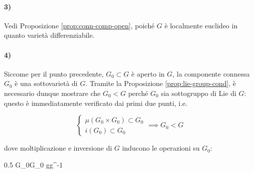 {\paragraph{3)}

Vedi Proposizione \ref{prop:conn-comp-open}, poiché $ G $ è localmente euclideo in quanto varietà differenziabile.

\paragraph{4)}

Siccome per il punto precedente, $ G_{0} \subset G $ è aperto in $ G $, la componente connessa $ G_{0} $ è una sottovarietà di $ G $. Tramite la Proposizione \ref{prop:lie-group-cond}, è necessario dunque mostrare che $ G_{0} < G $ perché $ G_{0} $ sia sottogruppo di Lie di $ G $: questo è immediatamente verificato dai primi due punti, i.e.

\begin{equation}
	\begin{cases}
		\mu(G_{0} \times G_{0}) \subset G_{0} \\
		i(G_{0}) \subset G_{0}
	\end{cases} %
	\implies %
	G_{0} < G
\end{equation}

dove moltiplicazione e inversione di $ G $ inducono le operazioni su $ G_{0} $:

	{0.5}{%
				{G_{0}}{G_{0}}
				{g}{g^{-1}}
			}
}


